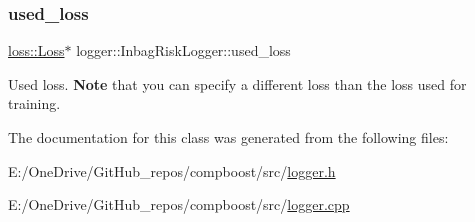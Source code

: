 \subsubsection{\texorpdfstring{used\+\_\+loss}{used\_loss}}
{\footnotesize\ttfamily \mbox{\hyperlink{classloss_1_1_loss}{loss\+::\+Loss}}$\ast$ logger\+::\+Inbag\+Risk\+Logger\+::used\+\_\+loss\hspace{0.3cm}{\ttfamily [private]}}



Used loss. {\bfseries Note} that you can specify a different loss than the loss used for training. 



The documentation for this class was generated from the following files\+:\begin{DoxyCompactItemize}
\item 
E\+:/\+One\+Drive/\+Git\+Hub\+\_\+repos/compboost/src/\mbox{\hyperlink{logger_8h}{logger.\+h}}\item 
E\+:/\+One\+Drive/\+Git\+Hub\+\_\+repos/compboost/src/\mbox{\hyperlink{logger_8cpp}{logger.\+cpp}}\end{DoxyCompactItemize}
